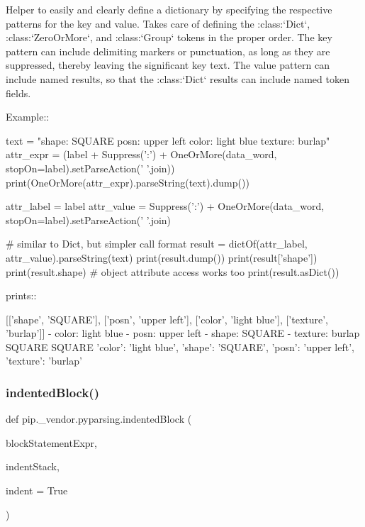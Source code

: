 \begin{DoxyVerb}Helper to easily and clearly define a dictionary by specifying
the respective patterns for the key and value.  Takes care of
defining the :class:`Dict`, :class:`ZeroOrMore`, and
:class:`Group` tokens in the proper order.  The key pattern
can include delimiting markers or punctuation, as long as they are
suppressed, thereby leaving the significant key text.  The value
pattern can include named results, so that the :class:`Dict` results
can include named token fields.

Example::

    text = "shape: SQUARE posn: upper left color: light blue texture: burlap"
    attr_expr = (label + Suppress(':') + OneOrMore(data_word, stopOn=label).setParseAction(' '.join))
    print(OneOrMore(attr_expr).parseString(text).dump())

    attr_label = label
    attr_value = Suppress(':') + OneOrMore(data_word, stopOn=label).setParseAction(' '.join)

    # similar to Dict, but simpler call format
    result = dictOf(attr_label, attr_value).parseString(text)
    print(result.dump())
    print(result['shape'])
    print(result.shape)  # object attribute access works too
    print(result.asDict())

prints::

    [['shape', 'SQUARE'], ['posn', 'upper left'], ['color', 'light blue'], ['texture', 'burlap']]
    - color: light blue
    - posn: upper left
    - shape: SQUARE
    - texture: burlap
    SQUARE
    SQUARE
    {'color': 'light blue', 'shape': 'SQUARE', 'posn': 'upper left', 'texture': 'burlap'}
\end{DoxyVerb}
 \mbox{\label{namespacepip_1_1__vendor_1_1pyparsing_aa7c18e89524a8f100a8cc89155a55eec}} 
\subsubsection{\texorpdfstring{indented\+Block()}{indentedBlock()}}
{\footnotesize\ttfamily def pip.\+\_\+vendor.\+pyparsing.\+indented\+Block (\begin{DoxyParamCaption}\item[{}]{block\+Statement\+Expr,  }\item[{}]{indent\+Stack,  }\item[{}]{indent = {\ttfamily True} }\end{DoxyParamCaption})}

